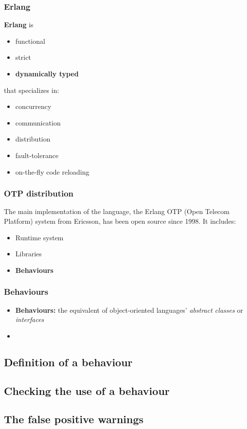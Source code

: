 \documentclass{beamer}
\begin{document}
\begin{frame}
	\frametitle{Erlang}
	\textbf{Erlang} is
	\begin{itemize}
		\item functional
		\item strict
		\item \textbf{dynamically typed}
	\end{itemize}
	that specializes in:
	\begin{itemize}
		\item concurrency
		\item communication
		\item distribution
		\item fault-tolerance
		\item on-the-fly code reloading
	\end{itemize}
\end{frame}

\begin{frame}
	\frametitle{OTP distribution}
	The main implementation of the language, the Erlang OTP 
	(Open Telecom Platform) system from Ericsson, has been
	open source since 1998. It includes:
	\pause
	\begin{itemize}
		\item Runtime system
		\item Libraries
		\item \textbf{Behaviours}
	\end{itemize}
\end{frame}

\begin{frame}
	\frametitle{Behaviours}
	\begin{itemize}
		\item \textbf{Behaviours:} the equivalent of
		object-oriented languages' \emph{abstract classes}
		or \emph{interfaces}
		\pause
		\item 
	\end{itemize}
\end{frame}

\subsection{Definition of a behaviour}
\subsection{Checking the use of a behaviour}
\subsection{The false positive warnings}
\end{document}
